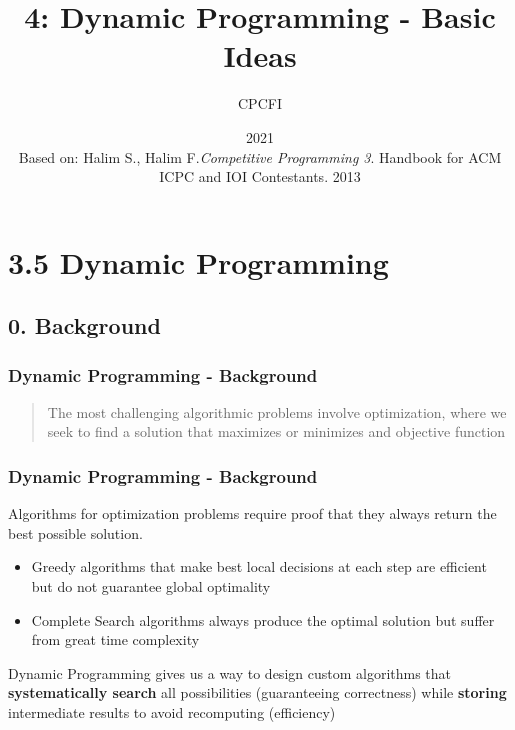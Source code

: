 \documentclass{beamer}
\title{4: Dynamic Programming - Basic Ideas}
\author{CPCFI}
\institute{UNAM's School of Engineering}
\date{2021 \\ \vspace{0.5cm} \scriptsize{Based on: Halim S., Halim F.\textit{Competitive Programming 3}}. Handbook for ACM ICPC and IOI Contestants. 2013}
\begin{document}
\frame{\titlepage}


\section{3.5 Dynamic Programming}

\subsection{0. Background}

\begin{frame}[fragile]
\frametitle{Dynamic Programming - Background}

\begin{quote}
    The most challenging algorithmic problems involve optimization, where we seek to find a solution that maximizes or minimizes and objective function
\end{quote}

\end{frame}

\begin{frame}[fragile]
\frametitle{Dynamic Programming - Background}

Algorithms for optimization problems require proof that they always return the best possible solution. 

\begin{itemize}
    \item Greedy algorithms that make best local decisions at each step are efficient but do not guarantee global optimality
    \pause
    \item Complete Search algorithms always produce the optimal solution but suffer from great time complexity
\end{itemize}

\pause
\vspace{0.3cm}

    Dynamic Programming gives us a way to design custom algorithms that \textbf{systematically search} all possibilities (guaranteeing correctness) while \textbf{storing} intermediate results to avoid recomputing (efficiency)

\end{frame}
\end{document}
